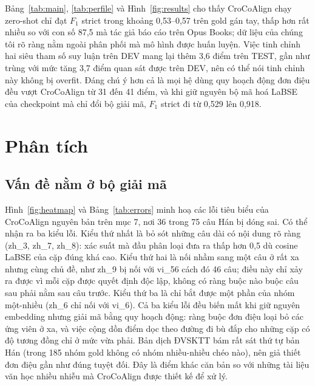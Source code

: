 \documentclass[11pt,a4paper]{article}
\newcommand{\croco}{CroCoAlign}
\begin{document}
Bảng~\ref{tab:main}, \ref{tab:perfile} và Hình~\ref{fig:results} cho thấy \croco{} chạy zero-shot chỉ đạt $F_1$ strict trong khoảng
0,53--0,57 trên gold gán tay, thấp hơn rất nhiều so với con số 87,5 mà tác giả báo cáo trên Opus Books; dữ liệu của
chúng tôi rõ ràng nằm ngoài phân phối mà mô hình được huấn luyện. Việc tinh chỉnh hai siêu tham số suy luận trên DEV
mang lại thêm 3,6 điểm trên TEST, gần như trùng với mức tăng 3,7 điểm quan sát được trên DEV, nên có thể nói tinh chỉnh
này không bị overfit. Đáng chú ý hơn cả là mọi hệ dùng quy hoạch động đơn điệu đều vượt \croco{} từ 31 đến 41 điểm, và
khi giữ nguyên bộ mã hoá LaBSE của checkpoint mà chỉ đổi bộ giải mã, $F_1$ strict đi từ 0,529 lên 0,918.

\section{Phân tích}\label{sec:analysis}

\subsection{Vấn đề nằm ở bộ giải mã}
Hình~\ref{fig:heatmap} và Bảng~\ref{tab:errors} minh hoạ các lỗi tiêu biểu của \croco{} nguyên bản trên mục 7, nơi 36 trong 75 câu Hán bị dóng
sai. Có thể nhận ra ba kiểu lỗi. Kiểu thứ nhất là bỏ sót những câu dài có nội dung rõ ràng (zh\_3, zh\_7, zh\_8): xác
suất mà đầu phân loại đưa ra thấp hơn 0,5 dù cosine LaBSE của cặp đúng khá cao. Kiểu thứ hai là nối nhầm sang một câu
ở rất xa nhưng cùng chủ đề, như zh\_9 bị nối với vi\_56 cách đó 46 câu; điều này chỉ xảy ra được vì mỗi cặp được quyết
định độc lập, không có ràng buộc nào buộc câu sau phải nằm sau câu trước. Kiểu thứ ba là chỉ bắt được một phần của
nhóm một-nhiều (zh\_6 chỉ nối với vi\_6). Cả ba kiểu lỗi đều biến mất khi giữ nguyên embedding nhưng giải mã bằng quy
hoạch động: ràng buộc đơn điệu loại bỏ các ứng viên ở xa, và việc cộng dồn điểm dọc theo đường đi bù đắp cho những cặp
có độ tương đồng chỉ ở mức vừa phải. Bản dịch ĐVSKTT bám rất sát thứ tự bản Hán (trong 185 nhóm gold không có nhóm
nhiều-nhiều chéo nào), nên giả thiết đơn điệu gần như đúng tuyệt đối. Đây là điểm khác căn bản so với những tài liệu văn
học nhiều nhiễu mà \croco{} được thiết kế để xử lý.
\end{document}
